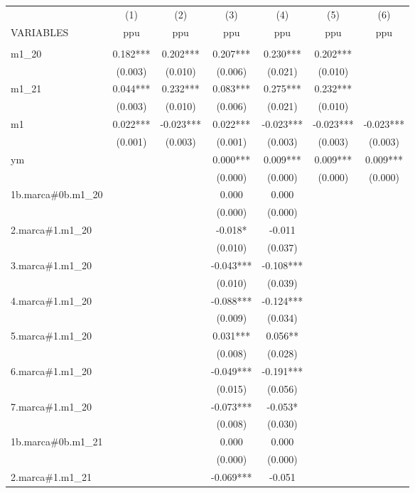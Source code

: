 \begin{longtable}{lcccccc} \hline
 & (1) & (2) & (3) & (4) & (5) & (6) \\
VARIABLES & ppu & ppu & ppu & ppu & ppu & ppu \\ \hline
 &  &  &  &  &  &  \\
m1\_20 & 0.182*** & 0.202*** & 0.207*** & 0.230*** & 0.202*** &  \\
 & (0.003) & (0.010) & (0.006) & (0.021) & (0.010) &  \\
m1\_21 & 0.044*** & 0.232*** & 0.083*** & 0.275*** & 0.232*** &  \\
 & (0.003) & (0.010) & (0.006) & (0.021) & (0.010) &  \\
m1 & 0.022*** & -0.023*** & 0.022*** & -0.023*** & -0.023*** & -0.023*** \\
 & (0.001) & (0.003) & (0.001) & (0.003) & (0.003) & (0.003) \\
ym &  &  & 0.000*** & 0.009*** & 0.009*** & 0.009*** \\
 &  &  & (0.000) & (0.000) & (0.000) & (0.000) \\
1b.marca\#0b.m1\_20 &  &  & 0.000 & 0.000 &  &  \\
 &  &  & (0.000) & (0.000) &  &  \\
2.marca\#1.m1\_20 &  &  & -0.018* & -0.011 &  &  \\
 &  &  & (0.010) & (0.037) &  &  \\
3.marca\#1.m1\_20 &  &  & -0.043*** & -0.108*** &  &  \\
 &  &  & (0.010) & (0.039) &  &  \\
4.marca\#1.m1\_20 &  &  & -0.088*** & -0.124*** &  &  \\
 &  &  & (0.009) & (0.034) &  &  \\
5.marca\#1.m1\_20 &  &  & 0.031*** & 0.056** &  &  \\
 &  &  & (0.008) & (0.028) &  &  \\
6.marca\#1.m1\_20 &  &  & -0.049*** & -0.191*** &  &  \\
 &  &  & (0.015) & (0.056) &  &  \\
7.marca\#1.m1\_20 &  &  & -0.073*** & -0.053* &  &  \\
 &  &  & (0.008) & (0.030) &  &  \\
1b.marca\#0b.m1\_21 &  &  & 0.000 & 0.000 &  &  \\
 &  &  & (0.000) & (0.000) &  &  \\
2.marca\#1.m1\_21 &  &  & -0.069*** & -0.051 &  &  \\

\end{longtable}
